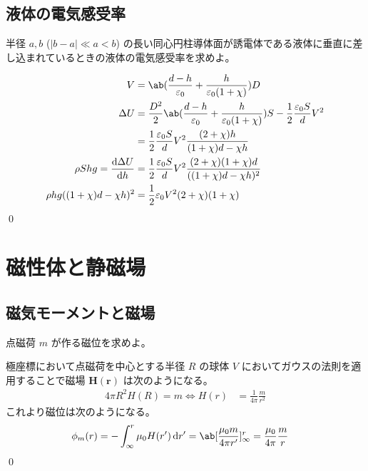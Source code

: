 \documentclass[uplatex,dvipdfmx,a4paper,11pt]{jlreq}
\makeatletter
\newcommand{\HH}{\bm{H}}
\newcommand{\rr}{\bm{r}}
\numberwithin{equation}{section}
\theoremstyle{definition}
\renewenvironment{proof}[1][\proofname]{\par
  \normalfont
  \topsep6\p@\@plus6\p@ \trivlist
  \item[\hskip\labelsep{\bfseries #1}\@addpunct{\bfseries}]\ignorespaces\quad\par
}{%
  \qed\endtrivlist\@endpefalse
}
\renewcommand\proofname{証明}
\makeatother
\begin{document}
\subsection{液体の電気感受率}
\begin{problem}
半径 $a, b$ ($|b - a| \ll a < b$) の長い同心円柱導体面が誘電体である液体に垂直に差し込まれているときの液体の電気感受率を求めよ。
\end{problem}
\begin{proof}
  \begin{align}
    V                               & = \ab(\frac{d - h}{\varepsilon_0} + \frac{h}{\varepsilon_0(1 + \chi)})D                                                       \\
    \Delta U                        & = \frac{D^2}{2}\ab(\frac{d - h}{\varepsilon_0} + \frac{h}{\varepsilon_0(1 + \chi)})S - \frac{1}{2}\frac{\varepsilon_0S}{d}V^2 \\
                                    & = \frac{1}{2}\frac{\varepsilon_0S}{d}V^2\frac{(2 + \chi)h}{(1 + \chi)d - \chi h}                                              \\
    \rho Shg = \diff{\Delta U}{h}   & = \frac{1}{2}\frac{\varepsilon_0S}{d}V^2\frac{(2 + \chi)(1 + \chi)d}{((1 + \chi)d - \chi h)^2}                                \\
    \rho hg((1 + \chi)d - \chi h)^2 & = \frac{1}{2}\varepsilon_0V^2(2 + \chi)(1 + \chi)                                                                             \\
  \end{align}
\end{proof}



\section{磁性体と静磁場}
\setcounter{subsection}{4}
\subsection{磁気モーメントと磁場}
\begin{problem}
点磁荷 $m$ が作る磁位を求めよ。
\end{problem}
\begin{proof}
  極座標において点磁荷を中心とする半径 $R$ の球体 $V$ においてガウスの法則を適用することで磁場 $\HH(\rr)$ は次のようになる。
  \begin{align}
    4\pi R^2H(R) = m \iff H(r) & = \frac{1}{4\pi}\frac{m}{r^2}
  \end{align}
  これより磁位は次のようになる。
  \begin{align}
    \phi_m(r) & = -\int_{\infty}^{r}\mu_0H(r')\dl{r'} = \ab[\frac{\mu_0m}{4\pi r'}]_{\infty}^{r} = \frac{\mu_0}{4\pi}\frac{m}{r}
  \end{align}
\end{proof}
\end{document}

